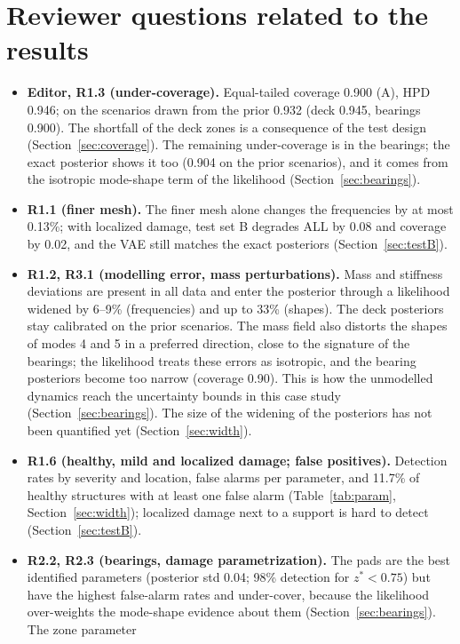 \documentclass[11pt]{article}
\begin{document}
\section{Reviewer questions related to the results}\label{sec:reviewers}
\begin{itemize}
\item \textbf{Editor, R1.3 (under-coverage).} Equal-tailed coverage 0.900 (A), HPD 0.946; on the scenarios drawn from
the prior 0.932 (deck 0.945, bearings 0.900). The shortfall of the deck zones is a consequence of the test design
(Section~\ref{sec:coverage}). The remaining under-coverage is in the bearings; the exact posterior shows it too (0.904
on the prior scenarios), and it comes from the isotropic mode-shape term of the likelihood (Section~\ref{sec:bearings}).
\item \textbf{R1.1 (finer mesh).} The finer mesh alone changes the frequencies by at most 0.13\%; with localized damage,
test set B degrades ALL by 0.08 and coverage by 0.02, and the VAE still matches the exact posteriors
(Section~\ref{sec:testB}).
\item \textbf{R1.2, R3.1 (modelling error, mass perturbations).} Mass and stiffness deviations are present in all data
and enter the posterior through a likelihood widened by 6--9\% (frequencies) and up to 33\% (shapes). The deck
posteriors stay calibrated on the prior scenarios. The mass field also distorts the shapes of modes 4 and 5 in a
preferred direction, close to the signature of the bearings; the likelihood treats these errors as isotropic, and the
bearing posteriors become too narrow (coverage 0.90). This is how the unmodelled dynamics reach the uncertainty bounds
in this case study (Section~\ref{sec:bearings}). The size of the widening of the posteriors has not been quantified
yet (Section~\ref{sec:width}).
\item \textbf{R1.6 (healthy, mild and localized damage; false positives).} Detection rates by severity and location,
false alarms per parameter, and 11.7\% of healthy structures with at least one false alarm
(Table~\ref{tab:param}, Section~\ref{sec:width}); localized damage next to a support is hard to detect
(Section~\ref{sec:testB}).
\item \textbf{R2.2, R2.3 (bearings, damage parametrization).} The pads are the best identified parameters (posterior
std 0.04; 98\% detection for $z^*<0.75$) but have the highest false-alarm rates and under-cover, because the
likelihood over-weights the mode-shape evidence about them (Section~\ref{sec:bearings}). The zone parameter

\end{itemize}
\end{document}
